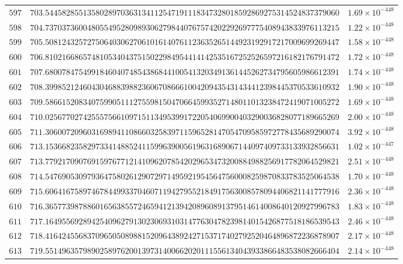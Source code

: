\documentclass[12pt,reqno]{amsart}
\theoremstyle{remark}
\begin{document}
\begin{longtable}{clc}
$597$ & $703.5445828551358028970363134112547191118347328018592869275314524837379060$ & $1.69\times 10^{-448}$ \\
$598$ & $704.7370373600480554952809893062798440767574202292697775408943833976113215$ & $1.22\times 10^{-448}$ \\
$599$ & $705.5081243257275064030627061016140761123635265144923192917217009699269447$ & $1.58\times 10^{-448}$ \\
$600$ & $706.8102166865748105340437515022984954414142535167252526597216182176791472$ & $1.72\times 10^{-448}$ \\
$601$ & $707.6800784754991846040748543868441005413203491361445262734795605986612391$ & $1.74\times 10^{-448}$ \\
$602$ & $708.3998521246043046883988236067086661004209435431434412398445370533610932$ & $1.90\times 10^{-448}$ \\
$603$ & $709.5866152083407599051112755981504706645993527148011013238472419071005272$ & $1.69\times 10^{-448}$ \\
$604$ & $710.0256770274255575661097151134953991722054069900403290036828077189665269$ & $2.00\times 10^{-448}$ \\
$605$ & $711.3060072096031698941108660325839711596528147054709585972778435689290074$ & $3.92\times 10^{-448}$ \\
$606$ & $713.1536682358297334148852411599639005619631689067144097409733133932856631$ & $1.02\times 10^{-447}$ \\
$607$ & $713.7792170907691597677121410962078542029653473200884988256917782064529821$ & $2.51\times 10^{-448}$ \\
$608$ & $714.5476905309793647580261290729714959219545647560008259870833783525064538$ & $1.70\times 10^{-448}$ \\
$609$ & $715.6064167589746784499337046071194279552184917563008578094406821141777916$ & $2.36\times 10^{-448}$ \\
$610$ & $716.3657739878860165638557246594121394208960891379514614008640120927996783$ & $1.83\times 10^{-448}$ \\
$611$ & $717.1649556928942540962791302306931031477630478239814015426877518186539543$ & $2.46\times 10^{-448}$ \\
$612$ & $718.4164245568370965050898815209643892427153717402792520464896872236878907$ & $2.17\times 10^{-448}$ \\
$613$ & $719.5514963579890258976200139731400662020111556134043933866483538082666404$ & $2.14\times 10^{-448}$ \\

\end{longtable}
\end{document}

